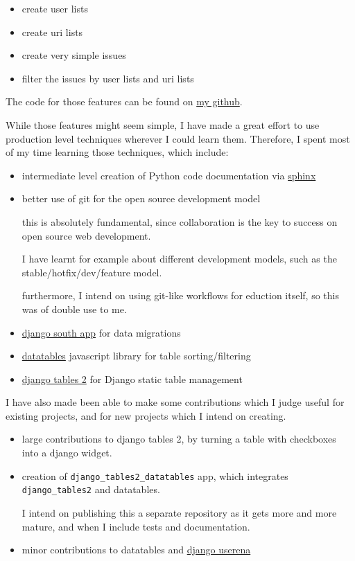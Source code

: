 \documentclass[12pt]{article}
\begin{document}
\begin{itemize}
  \item create user lists
  \item create uri lists
  \item create very simple issues
  \item filter the issues by user lists and uri lists
\end{itemize}

The code for those features can be found on \href{https://github.com/cirosantilli/python/tree/a25d7e5de30c7013e2802e4a5a3630e3b8372c07/cirosantilli/django}{my github}.

While those features might seem simple, I have made a great effort to use production level techniques
wherever I could learn them. Therefore, I spent most of my time learning those techniques, which include:

\begin{itemize}

  \item intermediate level creation of Python code documentation via \href{http://sphinx-doc.org/}{sphinx}

  \item better use of git for the open source development model
  
    this is absolutely fundamental, since collaboration is the key to success on open source
    web development.
    
    I have learnt for example about different development models, such as the stable/hotfix/dev/feature model.
    
    furthermore, I intend on using git-like workflows for eduction itself, so this was
    of double use to me.
    
  \item \href{http://south.aeracode.org/}{django south app} for data migrations
  \item \href{http://www.datatables.net}{datatables} javascript library for table sorting/filtering
  \item \href{https://github.com/bradleyayers/django-tables2/issues}{django tables 2} for Django static
    table management
\end{itemize}

I have also made been able to make some contributions which I judge useful for existing projects,
and for new projects which I intend on creating.

\begin{itemize}
  \item large contributions to django tables 2, by turning a table with checkboxes into a django widget.
  \item creation of \lstinline|django_tables2_datatables| app, which integrates \lstinline|django_tables2| and datatables.
  
    I intend on publishing this a separate repository as it gets more and more mature, and when I
    include tests and documentation.
  
  \item minor contributions to datatables and
    \href{https://github.com/bread-and-pepper/django-userena/}{django userena}
\end{itemize}
\end{document}
